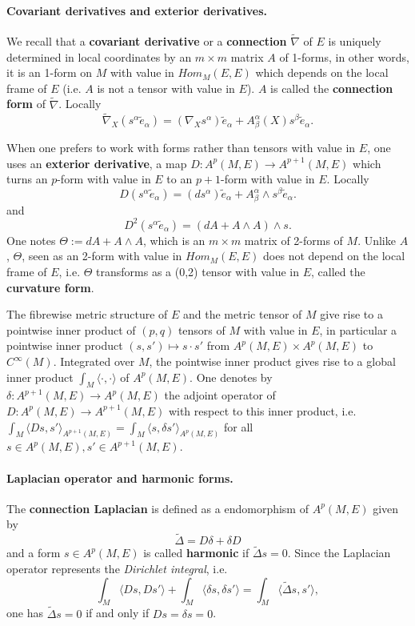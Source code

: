 \paragraph{Covariant derivatives and exterior derivatives.}
\label{sec:orgb225162}
We recall that a \textbf{covariant derivative} or a \textbf{connection} \(\tilde\nabla\) of \(E\) is uniquely determined in 
local coordinates by an \(m\times m\) matrix \(A\) of 1-forms, in other
words, it is an 1-form on \(M\) with value in \(Hom_M(E,E)\) which depends on the local frame
of \(E\) (i.e. \(A\) is not a tensor with value in \(E\)). \(A\) is called the
\textbf{connection form} of \(\tilde \nabla\). Locally
\[
 \tilde\nabla_X (s^\alpha \tilde e_\alpha) = (\nabla_X s^\alpha) \tilde e_\alpha +
A^\alpha_\beta(X)s^\beta\tilde e_\alpha.
\]



When one prefers to work with forms rather than tensors with value in \(E\), one uses an
\textbf{exterior derivative}, a map \(D: A^p(M,E) \longrightarrow A^{p+1}(M,E)\) which turns an
\(p\)-form with value in \(E\) to an \(p+1\)-form with value in \(E\). Locally 
\[
 D (s^\alpha \tilde e_\alpha) = (d s^\alpha) \tilde e_\alpha +
A^\alpha_\beta\wedge s^\beta\tilde e_\alpha.
\]
and 
\[
 D^2(s^\alpha \tilde e_\alpha) = (dA + A\wedge A)\wedge s.
\]
One notes \(\Theta := dA + A\wedge A\), which is an \(m\times m\) matrix of 2-forms of
\(M\). Unlike \(A\), \(\Theta\), seen as an 2-form with value in \(Hom_M(E,E)\)
does not depend on the local frame of \(E\), i.e. \(\Theta\) transforms as a (0,2)
tensor with value in \(E\), called the \textbf{curvature form}.



The fibrewise metric structure of \(E\) and the metric tensor of \(M\) give rise to a pointwise inner product of
\((p,q)\) tensors of \(M\) with value in \(E\), in particular a pointwise inner
product \((s, s')\mapsto s\cdot s'\) from \(A^p(M,E)\times A^p(M,E)\) to \(C^\infty(M)\). Integrated over \(M\), the pointwise inner product gives rise
to a global inner product \(\int_M \langle  \cdot,\cdot \rangle\) of \(A^p(M,E)\). One denotes by
\(\delta: A^{p+1}(M,E)\longrightarrow A^p(M,E)\) the adjoint operator of
\(D: A^p(M,E) \longrightarrow A^{p+1}(M,E)\) with respect to this inner product, i.e.
\(\int_M\langle Ds, s' \rangle_{A^{p+1}(M,E)} = \int_M\langle s, \delta s' \rangle_{A^{p}(M,E)}\) for
all \(s\in A^{p}(M,E), s'\in A^{p+1}(M,E)\).



\paragraph{Laplacian operator and harmonic forms.}
\label{sec:org4ed5e17}
The \textbf{connection Laplacian} is defined as a endomorphism of \(A^p(M,E)\) given by
\[
 \tilde \Delta = D\delta +\delta D
\]
and a form \(s\in A^p(M,E)\) is called \textbf{harmonic} if \(\tilde\Delta s=0\). Since the
Laplacian operator represents the \emph{Dirichlet integral}, i.e.
\[
 \int_M\langle Ds, Ds' \rangle + \int_M\langle \delta s, \delta s' \rangle = \int_M\langle \tilde\Delta s, s' \rangle,
\]
one has \(\tilde\Delta s = 0\) if and only if \(Ds = \delta s = 0\).



